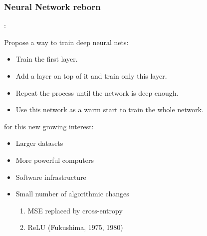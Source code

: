 \begin{frame}
	\frametitle{Neural Network reborn}
	


: 

\smallskip

Propose a way to train deep neural nets: 
\begin{itemize}
	\item Train the first layer. 
	\item Add a layer on top of it and train only this layer. 
	\item Repeat the process until the network is deep enough.
	\item Use this network as a warm start to train the whole network.
\end{itemize}

\bigskip

 for this new growing interest: 
\begin{itemize}
	\item Larger datasets
	\item More powerful computers
	\item Software infrastructure
	\item Small number of algorithmic changes
	\begin{enumerate}
		\item MSE replaced by cross-entropy
		\item ReLU (Fukushima, 1975, 1980)
	\end{enumerate}
\end{itemize}
\end{frame}








